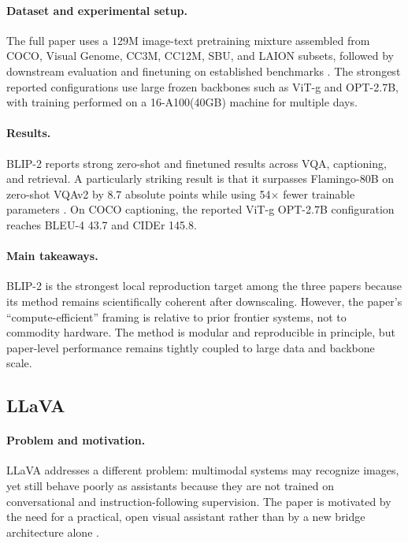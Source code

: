\documentclass[11pt]{article}
\begin{document}
\paragraph{Dataset and experimental setup.}
The full paper uses a 129M image-text pretraining mixture assembled from COCO,
Visual Genome, CC3M, CC12M, SBU, and LAION subsets, followed by downstream evaluation
and finetuning on established benchmarks \citep{li2023blip2}. The strongest reported
configurations use large frozen backbones such as ViT-g and OPT-2.7B, with training
performed on a 16-A100(40GB) machine for multiple days.

\paragraph{Results.}
BLIP-2 reports strong zero-shot and finetuned results across VQA, captioning, and
retrieval. A particularly striking result is that it surpasses Flamingo-80B on
zero-shot VQAv2 by 8.7 absolute points while using 54$\times$ fewer trainable
parameters \citep{li2023blip2}. On COCO captioning, the reported ViT-g OPT-2.7B
configuration reaches BLEU-4 43.7 and CIDEr 145.8.

\paragraph{Main takeaways.}
BLIP-2 is the strongest local reproduction target among the three papers because its method
remains scientifically coherent after downscaling. However, the paper's
``compute-efficient'' framing is relative to prior frontier systems, not to commodity
hardware. The method is modular and reproducible in principle, but paper-level
performance remains tightly coupled to large data and backbone scale.

\subsection{LLaVA}
\paragraph{Problem and motivation.}
LLaVA addresses a different problem: multimodal systems may recognize images, yet still
behave poorly as assistants because they are not trained on conversational and
instruction-following supervision. The paper is motivated by the need for a practical,
open visual assistant rather than by a new bridge architecture alone
\citep{liu2023visual}.
\end{document}
